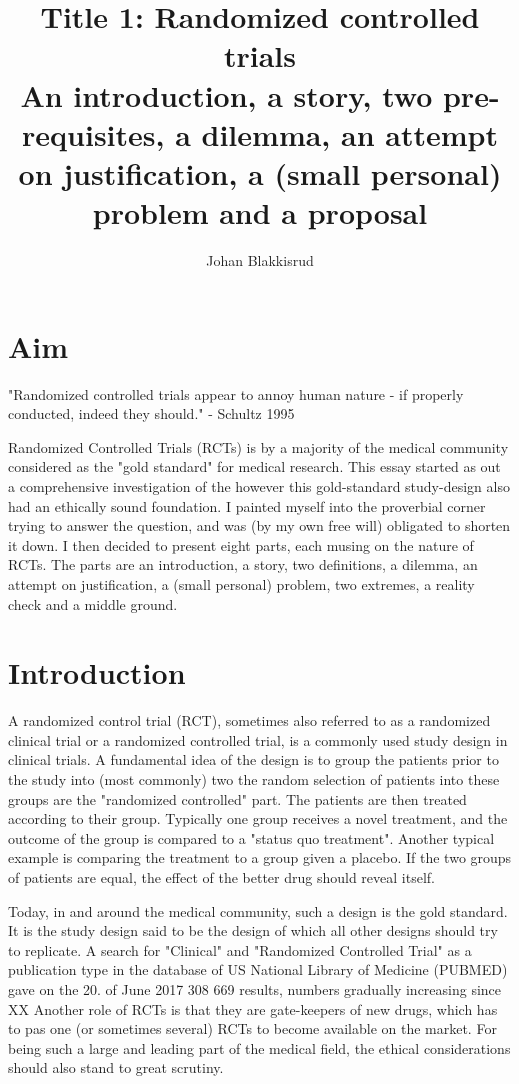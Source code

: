 \documentclass[12p]{article}
\title{Title 1: Randomized controlled trials \\ 
  \large{An introduction, a story, two pre-requisites, a dilemma, an attempt on justification, a (small personal) problem and a proposal}
}
\author{Johan Blakkisrud}
\begin{document}
\maketitle

\section*{Aim}

"Randomized controlled trials appear to annoy human nature - if properly conducted, indeed they should." - Schultz 1995

Randomized Controlled Trials (RCTs) is by a majority of the medical community considered as the "gold standard" for medical research.
This essay started as out a comprehensive investigation of the however this gold-standard study-design also had an ethically sound foundation.
I painted myself into the proverbial corner trying to answer the question, and was (by my own free will) obligated to shorten it down.
I then decided to present eight parts, each musing on the nature of RCTs.
The parts are an introduction, a story, two definitions, a dilemma, an attempt on justification, a (small personal) problem, two extremes, a reality check and a middle ground.

\section*{Introduction}

A randomized control trial (RCT), sometimes also referred to as a randomized clinical trial or a randomized controlled trial, is a commonly used study design in clinical trials.
A fundamental idea of the design is to group the patients prior to the study into (most commonly) two the random selection of patients into these groups are the "randomized controlled" part.
The patients are then treated according to their group.
Typically one group receives a novel treatment, and the outcome of the group is compared to a "status quo treatment".
Another typical example is comparing the treatment to a group given a placebo. 
If the two groups of patients are equal, the effect of the better drug should reveal itself.

Today, in and around the medical community, such a design is the gold standard.
It is the study design said to be the design of which all other designs should try to replicate. 
A search for "Clinical" and "Randomized Controlled Trial" as a publication type in the database of US National Library of Medicine (PUBMED) gave on the 20. of June 2017 308 669 results, numbers gradually increasing since XX
Another role of RCTs is that they are gate-keepers of new drugs, which has to pas one (or sometimes several) RCTs to become available on the market. 
For being such a large and leading part of the medical field, the ethical considerations should also stand to great scrutiny.
\end{document}
